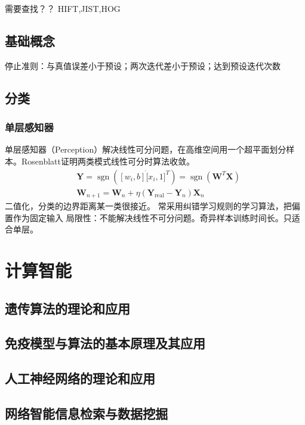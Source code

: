 \documentclass[UTF8]{../computerUniverse}
\DeclareMathOperator{\sgn}{sgn}
\begin{document}
需要查找？？ HIFT,JIST,HOG

\subsection{基础概念}
停止准则：与真值误差小于预设；两次迭代差小于预设；达到预设迭代次数

\subsection{分类}
\subsubsection{单层感知器}
单层感知器（Perception）解决线性可分问题，在高维空间用一个超平面划分样本。Rosenblatt证明两类模式线性可分时算法收敛。
\begin{equation}
\label{perception}
\begin{split}
&\boldsymbol Y = \sgn \left( [w_i,b] \dot [x_i,1]^T \right)=\sgn(\boldsymbol W^T \boldsymbol X)\\
&\boldsymbol W_{n+1}=\boldsymbol W_n + \eta (\boldsymbol Y_{\text{real} } -\boldsymbol Y_n ) \boldsymbol X_n 
\end{split}
\end{equation}
二值化，分类的边界距离某一类很接近。
常采用纠错学习规则的学习算法，把偏置作为固定输入
局限性：不能解决线性不可分问题。奇异样本训练时间长。只适合单层。







\section{计算智能}

\subsection{遗传算法的理论和应用}
\subsection{免疫模型与算法的基本原理及其应用}
\subsection{人工神经网络的理论和应用}
\subsection{网络智能信息检索与数据挖掘}
\end{document}
